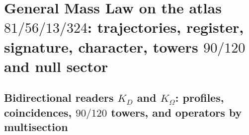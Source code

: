 \chapter{General Mass Law on the atlas \texorpdfstring{\(81/56/13/324\)}{81/56/13/324}: trajectories, register, signature, character, towers \texorpdfstring{\(90/120\)}{90/120} and null sector}
\label{chap:md-ley-general-masas-definitiva}
\begingroup
\renewcommand{\chapter}[2][]{}%

\endgroup

\begingroup
\let\HMTOwnerSection\section
\let\HMTOwnerSubsection\subsection
\let\HMTOwnerSubsubsection\subsubsection
\let\HMTOwnerParagraph\paragraph
\let\chapter\HMTOwnerSection
\let\section\HMTOwnerSubsection
\let\subsection\HMTOwnerSubsubsection
\let\subsubsection\HMTOwnerParagraph

\endgroup

\chapter{Bidirectional readers \texorpdfstring{\(K_D\)}{K D} and \texorpdfstring{\(K_\Omega\)}{K Omega}: profiles, coincidences, \texorpdfstring{\(90/120\)}{90/120} towers, and operators by multisection}
\label{chap:md-lectores-masicos-definitivo}
\begingroup
\renewcommand{\chapter}[2][]{}%

\endgroup


